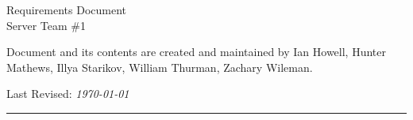 \begin{titlepage}

\noindent
\titlefont Requirements Document \\ Server Team \#1 \par
\epigraph{Document and its contents are created and maintained by Ian Howell, Hunter Mathews, Illya Starikov, William Thurman, Zachary Wileman.}%
{Last Revised: \textit{\today}\\\textsc{\lastEditAuthor}}
\null\vfill
\vspace*{1cm}
\noindent
\hfill
\begin{minipage}{0.35\linewidth}
    \begin{flushright}
        \printauthor
    \end{flushright}
\end{minipage}
%
\begin{minipage}{0.02\linewidth}
    \rule{1pt}{125pt}
\end{minipage}
\titlepagedecoration
\end{titlepage}
